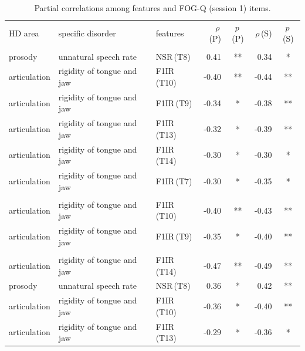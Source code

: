 \begin{table}[htb!]
\centering
	\begin{threeparttable}
		\caption{Partial correlations among features and FOG-Q (session 1) items.}
		\label{tab:ch6_partial_correlations}
		\footnotesize
		\centering
		\begin{tabular}{l l l r c r c}
			
			\hline\hline\noalign{\smallskip}
			\rowcolor{gray_table}
			HD area & specific disorder & features & $\rho$\,(P) & $p$\,(P) & $\rho$\,(S) & $p$\,(S) \\
			\noalign{\smallskip}
			\multicolumn{7}{c}{FOG\,(Q3)} \\
			\noalign{\smallskip}\hline\noalign{\smallskip}

			prosody      & unnatural speech rate      & NSR\,(T8)   &  0.41 & ** &  0.34 & *  \\
			articulation & rigidity of tongue and jaw & F1IR\,(T10) & -0.40 & ** & -0.44 & ** \\
			articulation & rigidity of tongue and jaw & F1IR\,(T9)  & -0.34 & *  & -0.38 & ** \\
			articulation & rigidity of tongue and jaw & F1IR\,(T13) & -0.32 & *  & -0.39 & ** \\
			articulation & rigidity of tongue and jaw & F1IR\,(T14) & -0.30 & *  & -0.30 & *  \\
			articulation & rigidity of tongue and jaw & F1IR\,(T7)  & -0.30 & *  & -0.35 & *  \\
			
			\noalign{\smallskip}\hline\noalign{\smallskip}
			\multicolumn{7}{c}{FOG\,(Q4)} \\
			\noalign{\smallskip}\hline\noalign{\smallskip}

			articulation & rigidity of tongue and jaw & F1IR\,(T10) & -0.40 & ** & -0.43 & ** \\
			articulation & rigidity of tongue and jaw & F1IR\,(T9)  & -0.35 & *  & -0.40 & ** \\
			
			\noalign{\smallskip}\hline\noalign{\smallskip}
			\multicolumn{7}{c}{FOG\,(Q5)} \\
			\noalign{\smallskip}\hline\noalign{\smallskip}

			articulation & rigidity of tongue and jaw & F1IR\,(T14) & -0.47 & ** & -0.49 & ** \\
			prosody      & unnatural speech rate      & NSR\,(T8)   &  0.36 & *  &  0.42 & ** \\
			articulation & rigidity of tongue and jaw & F1IR\,(T10) & -0.36 & *  & -0.40 & ** \\
			articulation & rigidity of tongue and jaw & F1IR\,(T13) & -0.29 & *  & -0.36 & *  \\
			

\end{tabular}
\end{threeparttable}
\end{table}
